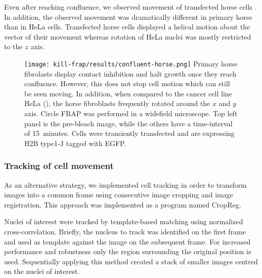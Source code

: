       Even after reaching confluence, we observed movement of transfected horse cells .
      In addition, the observed movement was dramatically different in primary horse than in HeLa cells.
      Transfected horse cells displayed a helical motion about the vector of their movement
      whereas rotation of HeLa nuclei was mostly restricted to the $z$ axis.

      \begin{figure}
        \centering
        \texttt{[image: kill-frap/results/confluent-horse.png]}
          {
            Primary horse fibrolasts display contact inhibition and halt growth
            once they reach confluence. However, this does not stop cell
            motion which can still be seen moving. In addition, when compared
            to the cancer cell line HeLa (),
            the horse fibroblasts frequently rotated around the $x$ and $y$
            axis. Circle FRAP was performed in a widefield microscope.
            Top left panel is the pre-bleach image, while the others have a
            time-interval of 15~minutes. Cells were transiently transfected
            and are expressing H2B type1-J tagged with EGFP.
          }
        \label{fig:kill-frap:confluent-horse}
      \end{figure}

    \subsubsection{Tracking of cell movement}

      As an alternative strategy, we implemented cell tracking
      in order to transform images into a common frame using
      consecutive image cropping and image registration.
      This approach was implemented as a program named CropReg.

      Nuclei of interest were tracked by template-based matching using normalized cross-correlation.
      Briefly, the nucleus to track was identified on the first frame and
      used as template against the image on the subsequent frame.
      For increased performance and robustness only the region surrounding the original position is used.
      Sequentially applying this method created a stack of smaller images centred on the nuclei of interest.

